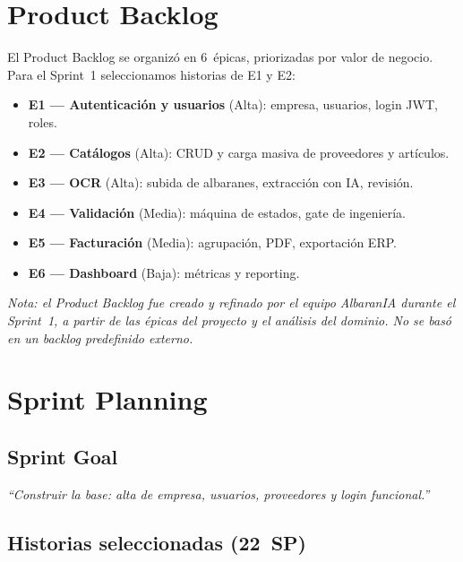 \documentclass[11pt,a4paper]{article}
\begin{document}
\section{Product Backlog}

El Product Backlog se organizó en 6~épicas, priorizadas por valor de negocio.
Para el Sprint~1 seleccionamos historias de E1 y E2:

\begin{itemize}
\item \textbf{E1 --- Autenticación y usuarios} (Alta): empresa, usuarios, login JWT, roles.
\item \textbf{E2 --- Catálogos} (Alta): CRUD y carga masiva de proveedores y artículos.
\item \textbf{E3 --- OCR} (Alta): subida de albaranes, extracción con IA, revisión.
\item \textbf{E4 --- Validación} (Media): máquina de estados, gate de ingeniería.
\item \textbf{E5 --- Facturación} (Media): agrupación, PDF, exportación ERP.
\item \textbf{E6 --- Dashboard} (Baja): métricas y reporting.
\end{itemize}

\noindent\textit{Nota: el Product Backlog fue creado y refinado por el
equipo AlbaranIA durante el Sprint~1, a partir de las épicas del proyecto
y el análisis del dominio. No se basó en un backlog predefinido externo.}

\section{Sprint Planning}

\subsection{Sprint Goal}

\begin{center}
\textit{``Construir la base: alta de empresa, usuarios, proveedores y login funcional.''}
\end{center}

\subsection{Historias seleccionadas (22~SP)}
\end{document}
